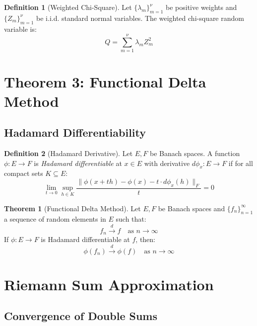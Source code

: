 \documentclass[11pt,a4paper]{article}
\theoremstyle{definition}
\newtheorem{definition}{Definition}[section]
\newtheorem{theorem}{Theorem}[section]
\begin{document}
\begin{definition}[Weighted Chi-Square]
Let $\{\lambda_m\}_{m=1}^{\nu}$ be positive weights and $\{Z_m\}_{m=1}^{\nu}$ be i.i.d. standard normal variables. The weighted chi-square random variable is:
\begin{equation}
Q = \sum_{m=1}^{\nu} \lambda_m Z_m^2
\end{equation}
\end{definition}

\section{Theorem 3: Functional Delta Method}

\subsection{Hadamard Differentiability}

\begin{definition}[Hadamard Derivative]
Let $E, F$ be Banach spaces. A function $\phi: E \to F$ is \emph{Hadamard differentiable} at $x \in E$ with derivative $d\phi_x: E \to F$ if for all compact sets $K \subseteq E$:
\begin{equation}
\lim_{t \to 0} \sup_{h \in K} \frac{\|\phi(x + th) - \phi(x) - t \cdot d\phi_x(h)\|_F}{t} = 0
\end{equation}
\end{definition}

\begin{theorem}[Functional Delta Method]
Let $E, F$ be Banach spaces and $\{f_n\}_{n=1}^{\infty}$ a sequence of random elements in $E$ such that:
\begin{equation}
f_n \stackrel{d}{\longrightarrow} f \quad \text{as } n \to \infty
\end{equation}
If $\phi: E \to F$ is Hadamard differentiable at $f$, then:
\begin{equation}
\phi(f_n) \stackrel{d}{\longrightarrow} \phi(f) \quad \text{as } n \to \infty
\end{equation}
\end{theorem}

\section{Riemann Sum Approximation}

\subsection{Convergence of Double Sums}
\end{document}
